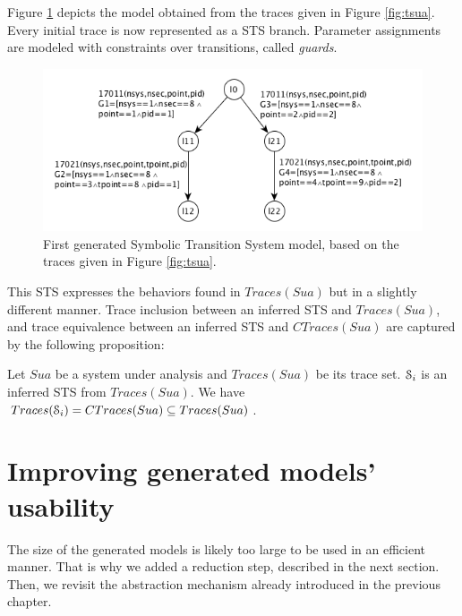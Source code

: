 Figure \ref{fig:firstmodel} depicts the model obtained from the
traces given in Figure \ref{fig:tsua}. Every initial trace is now
represented as a STS branch. Parameter assignments are modeled
with constraints over transitions, called \textit{guards}.

\begin{figure}[ht]
    \begin{center}
        \includegraphics[width=1.0\linewidth]{figures/STS1.png}
    \end{center}

  \caption{First generated Symbolic Transition System model,
  based on the traces given in Figure \ref{fig:tsua}.}
  \label{fig:firstmodel}
\end{figure}

This STS expresses the behaviors found in $Traces(Sua)$ but in a
slightly different manner. Trace inclusion \cite{petrenko06}
between an inferred STS and $Traces(Sua)$, and trace equivalence
\cite{petrenko06} between an inferred STS and $CTraces(Sua)$ are
captured by the following proposition:

\begin{proposition}
    Let $\mathit{Sua}$ be a system under analysis and $Traces(Sua)$ be its
    trace set. $\EuScript{S}_i$ is an inferred STS from
    $Traces(Sua)$.
    We have $Traces(\EuScript{S}_i) = CTraces(Sua) \subseteq Traces(Sua)$.

	\label{def:equivtraces_IOSTS}
\end{proposition}


\section{Improving generated models' usability}
\label{sec:modelinf:usability}

The size of the generated models is likely too large to be used
in an efficient manner. That is why we added a reduction step,
described in the next section. Then, we revisit the abstraction
mechanism already introduced in the previous chapter.

